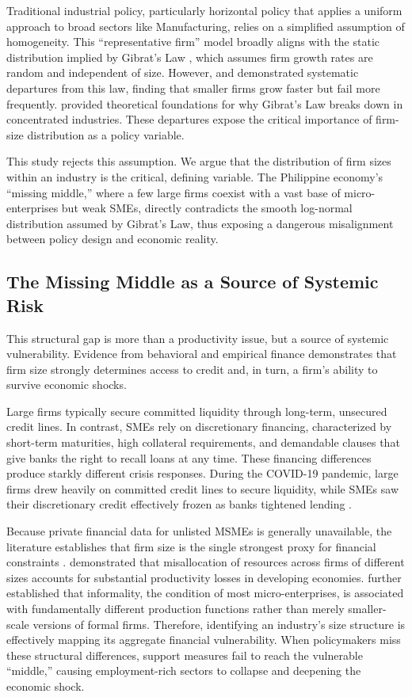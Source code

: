 \documentclass[acmtog, nonacm]{acmart}
\begin{document}
Traditional industrial policy, particularly horizontal policy that applies a uniform approach to broad sectors like Manufacturing, relies on a simplified assumption of homogeneity. This ``representative firm'' model broadly aligns with the static distribution implied by Gibrat's Law \citep{samuels1965}, which assumes firm growth rates are random and independent of size. However, \citet{evans1987} and \citet{hall1987} demonstrated systematic departures from this law, finding that smaller firms grow faster but fail more frequently. \citet{sutton1997} provided theoretical foundations for why Gibrat's Law breaks down in concentrated industries. These departures expose the critical importance of firm-size distribution as a policy variable.

This study rejects this assumption. We argue that the distribution of firm sizes within an industry is the critical, defining variable. The Philippine economy's ``missing middle,'' where a few large firms coexist with a vast base of micro-enterprises but weak SMEs, directly contradicts the smooth log-normal distribution assumed by Gibrat's Law, thus exposing a dangerous misalignment between policy design and economic reality.

\subsection{The Missing Middle as a Source of Systemic Risk}
This structural gap is more than a productivity issue, but a source of systemic vulnerability. Evidence from behavioral and empirical finance demonstrates that firm size strongly determines access to credit and, in turn, a firm's ability to survive economic shocks.

Large firms typically secure committed liquidity through long-term, unsecured credit lines. In contrast, SMEs rely on discretionary financing, characterized by short-term maturities, high collateral requirements, and demandable clauses that give banks the right to recall loans at any time. These financing differences produce starkly different crisis responses. During the COVID-19 pandemic, large firms drew heavily on committed credit lines to secure liquidity, while SMEs saw their discretionary credit effectively frozen as banks tightened lending \citep{chodorow2022}.

Because private financial data for unlisted MSMEs is generally unavailable, the literature establishes that firm size is the single strongest proxy for financial constraints \citep{beck2008}. \citet{hsieh2009} demonstrated that misallocation of resources across firms of different sizes accounts for substantial productivity losses in developing economies. \citet{laporta2014} further established that informality, the condition of most micro-enterprises, is associated with fundamentally different production functions rather than merely smaller-scale versions of formal firms. Therefore, identifying an industry's size structure is effectively mapping its aggregate financial vulnerability. When policymakers miss these structural differences, support measures fail to reach the vulnerable ``middle,'' causing employment-rich sectors to collapse and deepening the economic shock.
\end{document}
